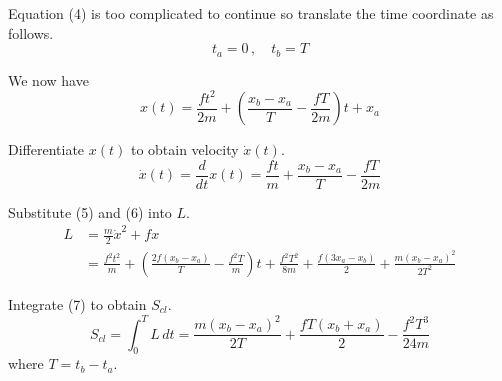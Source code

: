 Equation (4) is too complicated to continue so translate the time coordinate as follows.
\begin{equation*}
t_a=0\,, %
\quad
t_b=T
\end{equation*}

We now have
\begin{equation*}
x(t)=\frac{ft^2}{2m}+\left(\frac{x_b-x_a}{T}-\frac{fT}{2m}\right)t+x_a
\tag{5}
\end{equation*}

Differentiate $x(t)$ to obtain velocity $\dot x(t)$.
\begin{equation*}
\dot x(t)=
\frac{d}{dt}x(t)=\frac{ft}{m}+\frac{x_b-x_a}{T}-\frac{fT}{2m}
\tag{6}
\end{equation*}

Substitute (5) and (6) into $L$.
\begin{align*}
L&=\frac{m}{2}\dot x^2+fx
\\[1ex]
&=\frac{f^2t^2}{m}
+\left(\frac{2f(x_b-x_a)}{T}-\frac{f^2T}{m}\right)t
+\frac{f^2T^2}{8m}
+\frac{f(3x_a-x_b)}{2}
+\frac{m(x_b-x_a)^2}{2T^2}
\tag{7}
\end{align*}

Integrate (7) to obtain $S_{cl}$.
\begin{equation*}
S_{cl}=\int_0^T L\,dt
=\frac{m(x_b-x_a)^2}{2T}+\frac{fT(x_b+x_a)}{2}-\frac{f^2T^3}{24m}
\tag{8}
\end{equation*}
where $T=t_b-t_a$.


